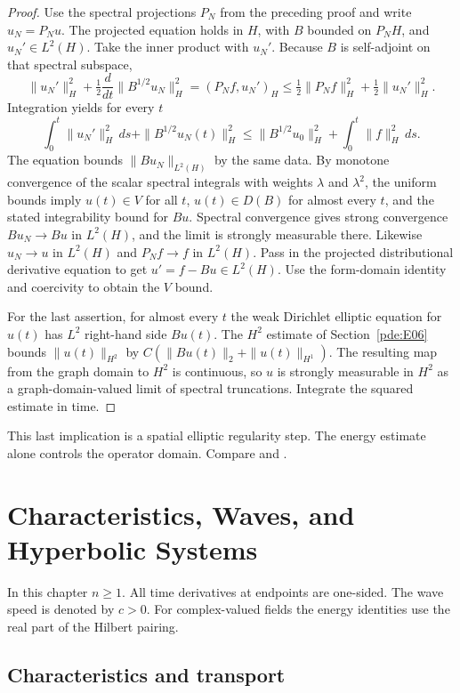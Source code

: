 \documentclass[11pt,oneside,openany]{book}
\theoremstyle{plain}
\theoremstyle{definition}
\theoremstyle{remark}
\begin{document}
\begin{proof}
Use the spectral projections \(P_N\) from the preceding proof
and write \(u_N=P_Nu\).
The projected equation holds in \(H\), with \(B\) bounded on
\(P_NH\), and \(u_N'\in L^2(H)\).
Take the inner product with \(u_N'\). Because \(B\) is
self-adjoint on that spectral subspace,
\[
 \|u_N'\|_H^2+\tfrac12\frac{d}{dt}\|B^{1/2}u_N\|_H^2
        =(P_Nf,u_N')_H
        \leq \tfrac12\|P_N f\|_H^2+\tfrac12\|u_N'\|_H^2.
\]
Integration yields for every \(t\)
\[
 \int_0^t\|u_N'\|_H^2\,ds+\|B^{1/2}u_N(t)\|_H^2
 \leq \|B^{1/2}u_0\|_H^2+\int_0^t\|f\|_H^2\,ds .
\]
The equation bounds \(\|Bu_N\|_{L^2(H)}\) by the same data.
By monotone convergence of the scalar spectral integrals
with weights \(\lambda\) and \(\lambda^2\), the uniform
bounds imply \(u(t)\in V\) for all \(t\),
\(u(t)\in D(B)\) for almost every \(t\), and the stated
integrability bound for \(Bu\).
Spectral convergence gives strong convergence
\(Bu_N\to Bu\) in \(L^2(H)\), and the limit is strongly
measurable there. Likewise \(u_N\to u\) in \(L^2(H)\)
and \(P_Nf\to f\) in \(L^2(H)\).
Pass in the projected distributional derivative equation to
get \(u'=f-Bu\in L^2(H)\). Use the form-domain identity and
coercivity to obtain the \(V\) bound.

For the last assertion, for almost every \(t\) the weak
Dirichlet elliptic equation for \(u(t)\) has \(L^2\)
right-hand side \(Bu(t)\).
The \(H^2\) estimate of Section~\ref{pde:E06} bounds
\(\|u(t)\|_{H^2}\) by \(C(\|Bu(t)\|_2+\|u(t)\|_{H^1})\).
The resulting map from the graph domain to \(H^2\) is
continuous, so \(u\) is strongly measurable in \(H^2\)
as a graph-domain-valued limit of spectral truncations.
Integrate the squared estimate in time.
\end{proof}

This last implication is a spatial elliptic regularity step.
The energy estimate alone controls the operator domain.
Compare \cite[\S 7.1.3, Theorem 5]{Evans} and
\cite[\S 10.1]{Brezis}.
\chapter{Characteristics, Waves, and Hyperbolic Systems}
\label{chap:pde-hyperbolic}

In this chapter \(n\geq 1\). All time derivatives at endpoints are
one-sided. The wave speed is denoted by \(c>0\). For complex-valued
fields the energy identities use the real part of the Hilbert pairing.

\section{Characteristics and transport}\label{pde:W01}
\end{document}
